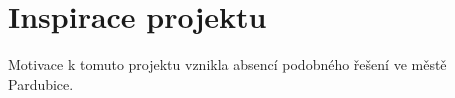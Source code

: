 \section{Inspirace projektu}
Motivace k tomuto projektu vznikla absencí podobného řešení ve městě Pardubice.